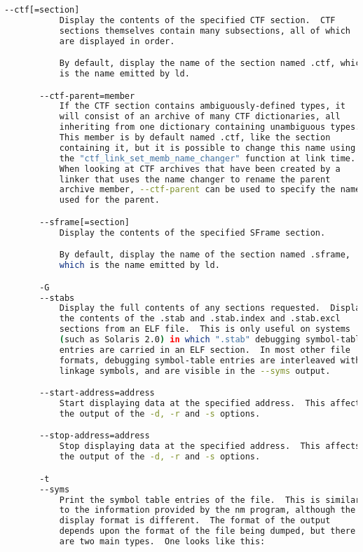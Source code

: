 {{\begin{lstlisting}[language=bash]
       --ctf[=section]
           Display the contents of the specified CTF section.  CTF
           sections themselves contain many subsections, all of which
           are displayed in order.

           By default, display the name of the section named .ctf, which
           is the name emitted by ld.

       --ctf-parent=member
           If the CTF section contains ambiguously-defined types, it
           will consist of an archive of many CTF dictionaries, all
           inheriting from one dictionary containing unambiguous types.
           This member is by default named .ctf, like the section
           containing it, but it is possible to change this name using
           the "ctf_link_set_memb_name_changer" function at link time.
           When looking at CTF archives that have been created by a
           linker that uses the name changer to rename the parent
           archive member, --ctf-parent can be used to specify the name
           used for the parent.

       --sframe[=section]
           Display the contents of the specified SFrame section.

           By default, display the name of the section named .sframe,
           which is the name emitted by ld.

       -G
       --stabs
           Display the full contents of any sections requested.  Display
           the contents of the .stab and .stab.index and .stab.excl
           sections from an ELF file.  This is only useful on systems
           (such as Solaris 2.0) in which ".stab" debugging symbol-table
           entries are carried in an ELF section.  In most other file
           formats, debugging symbol-table entries are interleaved with
           linkage symbols, and are visible in the --syms output.

       --start-address=address
           Start displaying data at the specified address.  This affects
           the output of the -d, -r and -s options.

       --stop-address=address
           Stop displaying data at the specified address.  This affects
           the output of the -d, -r and -s options.

       -t
       --syms
           Print the symbol table entries of the file.  This is similar
           to the information provided by the nm program, although the
           display format is different.  The format of the output
           depends upon the format of the file being dumped, but there
           are two main types.  One looks like this:


\end{lstlisting}}}
